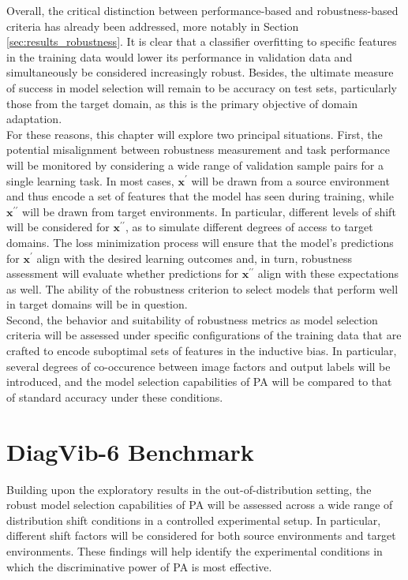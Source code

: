Overall, the critical distinction between performance-based and robustness-based criteria 
has already been addressed, more notably in Section \ref{sec:results_robustness}.
It is clear that a classifier overfitting to specific features in the training data
would lower its performance in validation data and simultaneously be considered
increasingly robust. Besides, the ultimate measure of success in model selection will remain
to be accuracy on test sets, particularly those from the target domain, as this is the primary
objective of domain adaptation.  \\

For these reasons, this chapter will explore two principal situations. First, the potential 
misalignment between robustness measurement and task performance will be monitored by 
considering a wide range of validation sample pairs for a single learning task. In most cases, 
$\bm{x}^\prime$ will be drawn from a source environment and thus encode a set of features that 
the model has seen during training, while $\bm{x}^{\prime \prime}$ will be drawn from target 
environments. In particular, different levels of shift will be considered for $\bm{x}^{\prime \prime}$,
as to simulate different degrees of access to target domains. The loss minimization process will 
ensure that the model's predictions for $\bm{x}^\prime$ align with the desired learning outcomes
and, in turn, robustness assessment will evaluate whether predictions for $\bm{x}^{\prime \prime}$ 
align with these expectations as well. The ability of the robustness criterion to select models
that perform well in target domains will be in question. \\

Second, the behavior and suitability of robustness metrics as model selection criteria
will be assessed under specific configurations of the training data that are crafted to
encode suboptimal sets of features in the inductive bias. In particular, several degrees of
co-occurence between image factors and output labels will be introduced, and the model 
selection capabilities of PA will be compared to that of standard 
accuracy under these conditions.

\section{DiagVib-6 Benchmark}\label{chapter:msel_controlled}

Building upon the exploratory results in the out-of-distribution setting, 
the robust model selection capabilities of PA will be assessed across a
wide range of distribution shift conditions in a controlled experimental setup. In particular,
different shift factors will be considered for both source environments and target 
environments. These findings will help identify the experimental conditions in which the 
discriminative power of PA is most effective. \\


